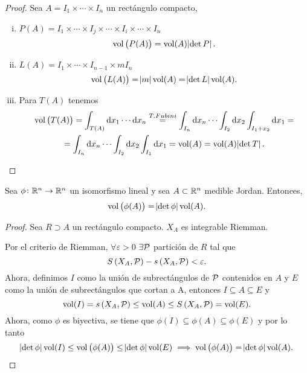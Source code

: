 \begin{proof}
    Sea $A = I_1 \times \cdots \times I_n$ un rectángulo compacto,
    \begin{enumerate}[i)]
        \item $P(A) = I_1 \times \cdots \times I_j \times \cdots \times I_i \times \cdots \times I_n$
            \[
                \operatorname{vol}\left( P(A) \right) = \operatorname{vol}(A) \abs{\det P}.
            \]
        \item $L(A) = I_1 \times \cdots \times I_{n-1} \times mI_n$
            \[
                \operatorname{vol}\left( L(A) \right) = \abs{m} \operatorname{vol}(A) = \abs{\det L} \operatorname{vol}(A).
            \]
        \item Para $T(A)$ tenemos
            \begin{gather*}
                \vol\left( T(A) \right) = \int_{T(A)} \dif x_1 \cdots \dif x_n \stackrel{T.Fubini}{=}
                \int_{I_n} \dif x_n \cdots \int_{I_2} \dif x_2 \int_{I_1 + x_2} \dif x_1 = \\ =
                \int_{I_n} \dif x_n \cdots \int_{I_2} \dif x_2 \int_{I_1} \dif x_1 = \vol(A) = \vol(A) \abs{\det T}.
            \end{gather*} 
    \end{enumerate}
\end{proof}

\begin{lema*}[2]\label{lema:dos_cambio}
    Sea $\phi \colon \mathbb{R}^n \to \mathbb{R}^n$ un isomorfismo lineal y sea $A \subset \mathbb{R}^n$ medible Jordan.
    Entonces,
    \[
        \operatorname{vol}\left( \phi(A) \right) = \abs{\det \phi} \operatorname{vol}(A).
    \]
\end{lema*}

\begin{proof}
    Sea $R \supset A$ un rectángulo compacto. $X_A$ es integrable Riemman.

    Por el criterio de Riemman, $\forall \varepsilon > 0$ $\exists \mathcal{P}$ partición de $R$ tal que
    \[
        S\left( X_A, \mathcal{P} \right) - s\left( X_A, \mathcal{P} \right) < \varepsilon.
    \]
    Ahora, definimos $I$ como la unión de subrectángulos de $\mathcal{P}$ contenidos en $A$ y $E$ como la unión de subrectángulos
    que cortan a A, entonces $I \subseteq A \subseteq E$ y
    \[
        \operatorname{vol}(I) = s\left( X_A, \mathcal{P} \right) \leq \operatorname{vol}(A) \leq S\left( X_A, \mathcal{P} \right) = \operatorname{vol}(E).
    \]
    Ahora, como $\phi$ es biyectiva, se tiene que $\phi(I) \subseteq \phi(A) \subseteq \phi(E)$ y por lo tanto
    \[
        \abs{\det\phi} \operatorname{vol}(I) \leq \operatorname{vol}\left( \phi(A) \right) \leq \abs{\det\phi} \operatorname{vol}(E) \implies
        \operatorname{vol}\left( \phi(A) \right) = \abs{\det \phi} \operatorname{vol}(A).
    \]
\end{proof}


